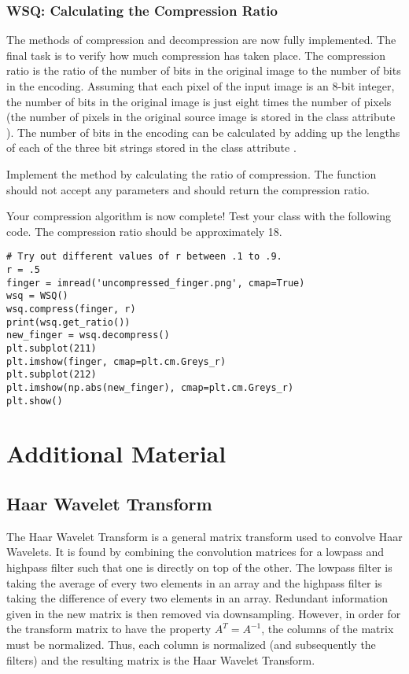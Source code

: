 \subsubsection*{WSQ: Calculating the Compression Ratio}
The methods of compression and decompression are now fully implemented. The final task is to verify how much compression has taken place.
The compression ratio is the ratio of the number of bits in the original image to the number of bits in the encoding.
Assuming that each pixel of the input image is an 8-bit integer, the number of bits in the original image is just eight times the number of pixels
(the number of pixels in the original source image is stored in the class attribute ).
The number of bits in the encoding can be calculated by adding up the lengths of each of the three bit strings stored in the class attribute .
\begin{problem}
Implement the method  by calculating the ratio of compression.
The function should not accept any parameters and should return the compression ratio.

Your compression algorithm is now complete! Test your class with the following code.
The compression ratio should be approximately 18.
\begin{lstlisting}
# Try out different values of r between .1 to .9.
r = .5
finger = imread('uncompressed_finger.png', cmap=True)
wsq = WSQ()
wsq.compress(finger, r)
print(wsq.get_ratio())
new_finger = wsq.decompress()
plt.subplot(211)
plt.imshow(finger, cmap=plt.cm.Greys_r)
plt.subplot(212)
plt.imshow(np.abs(new_finger), cmap=plt.cm.Greys_r)
plt.show()
\end{lstlisting}
\end{problem}
\newpage

\section*{Additional Material} %
\subsection*{Haar Wavelet Transform}
The Haar Wavelet Transform is a general matrix transform used to convolve Haar Wavelets.
It is found by combining the convolution matrices for a lowpass and highpass filter such that one is directly on top of the other.
The lowpass filter is taking the average of every two elements in an array and the highpass filter is taking the difference of every two elements in an array.
Redundant information given in the new matrix is then removed via downsampling.
However, in order for the transform matrix to have the property $A^T=A^{-1}$, the columns of the matrix must be normalized.
Thus, each column is normalized (and subsequently the filters) and the resulting matrix is the Haar Wavelet Transform.

